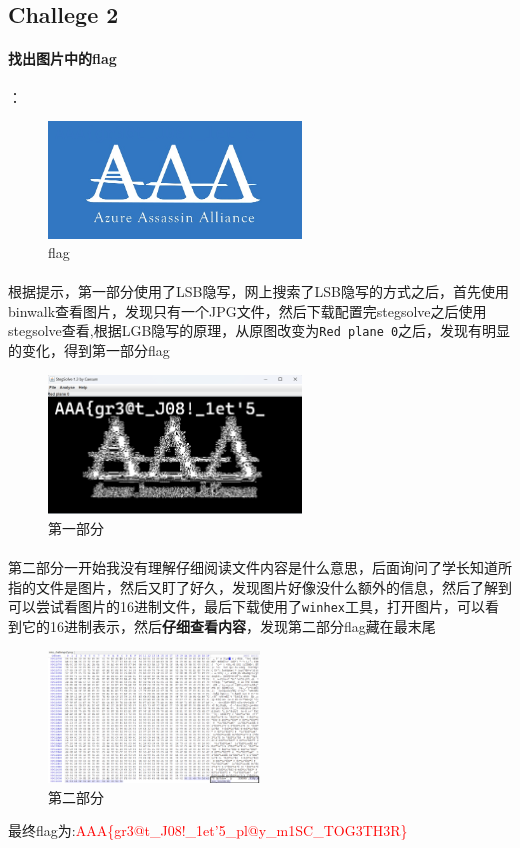 \documentclass{article}
\begin{document}
\subsection*{Challege 2}
\paragraph*{找出图片中的flag}：
\begin{figure}[H]
    \centering
    \includegraphics[width=0.6\textwidth]{./figure/misc_challenge2.png}
    \caption{flag}
\end{figure}
\paragraph*{}根据提示，第一部分使用了LSB隐写，网上搜索了LSB隐写的方式之后，首先使用binwalk查看图片，发现只有一个JPG文件，然后下载配置完stegsolve之后使用stegsolve查看,根据LGB隐写的原理，从原图改变为\texttt{Red plane 0}之后，发现有明显的变化，得到第一部分flag
\begin{figure}[H]
    \centering
    \includegraphics[width=0.6\textwidth]{./figure/Part1.png}
    \caption{第一部分}
\end{figure}
\paragraph*{}第二部分一开始我没有理解仔细阅读文件内容是什么意思，后面询问了学长知道所指的文件是图片，然后又盯了好久，发现图片好像没什么额外的信息，然后了解到可以尝试看图片的16进制文件，最后下载使用了\texttt{winhex}工具，打开图片，可以看到它的16进制表示，然后\textbf{仔细查看内容}，发现第二部分flag藏在最末尾
\begin{figure}[H]
    \centering
    \includegraphics[width=0.5\textwidth]{./figure/part2.png}
    \caption{第二部分}
\end{figure}
最终flag为:\textcolor{red}{AAA\{gr3@t\_J08!\_1et'5_pl@y\_m1SC\_TOG3TH3R\}}
\end{document}

